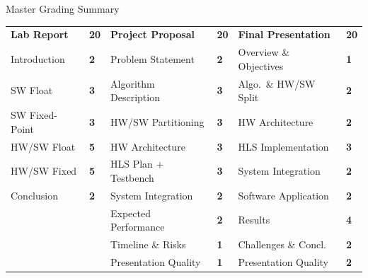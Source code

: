 \documentclass[10pt,aspectratio=169]{beamer}
\begin{document}
\begin{frame}{Master Grading Summary}
\setlength{\extrarowheight}{2pt}\setlength{\tabcolsep}{4pt}
{\small{}
\begin{tabular}{p{2.7cm}>{\raggedleft\arraybackslash}p{0.5cm}p{3.3cm}>{\raggedleft\arraybackslash}p{0.5cm}p{3.3cm}>{\raggedleft\arraybackslash}p{0.5cm}}
\rowcolor{Navy}\textbf{\color{white}Lab Report} & \textbf{\color{white}20} &
\cellcolor{Blue}\textbf{\color{white}Project Proposal} & \cellcolor{Blue}\textbf{\color{white}20} &
\cellcolor{Teal}\textbf{\color{white}Final Presentation} & \cellcolor{Teal}\textbf{\color{white}20} \tabularnewline
Introduction & \textbf{\color{Navy!60}2} & Problem Statement & \textbf{\color{CP}2} & Overview \& Objectives & \textbf{\color{CF}1} \tabularnewline
SW Float & \textbf{\color{C2}3} & Algorithm Description & \textbf{\color{CP}3} & Algo.\ \& HW/SW Split & \textbf{\color{CF}2} \tabularnewline
SW Fixed-Point & \textbf{\color{C3}3} & HW/SW Partitioning & \textbf{\color{CP}3} & HW Architecture & \textbf{\color{CF}2} \tabularnewline
HW/SW Float & \textbf{\color{C4}5} & HW Architecture & \textbf{\color{CP}3} & HLS Implementation & \textbf{\color{C4}3} \tabularnewline
HW/SW Fixed & \textbf{\color{C5}5} & HLS Plan + Testbench & \textbf{\color{CP}3} & System Integration & \textbf{\color{CF}2} \tabularnewline
Conclusion & \textbf{\color{C6}2} & System Integration & \textbf{\color{Teal}2} & Software Application & \textbf{\color{CF}2} \tabularnewline
 & & Expected Performance & \textbf{\color{Teal}2} & Results & \textbf{\color{C5}4} \tabularnewline
 & & Timeline \& Risks & \textbf{\color{C6}1} & Challenges \& Concl. & \textbf{\color{CF}2} \tabularnewline
 & & Presentation Quality & \textbf{\color{C6}1} & Presentation Quality & \textbf{\color{CF}2} \tabularnewline
\end{tabular}}
\end{frame}
\end{document}
